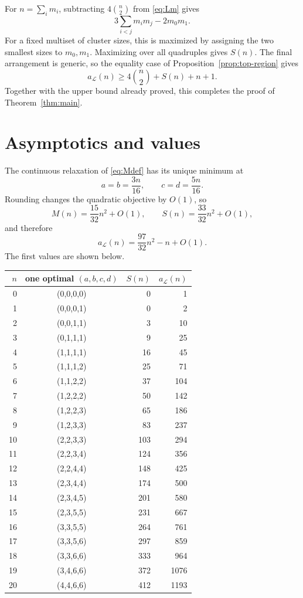 \documentclass[11pt]{article}
\theoremstyle{plain}
\theoremstyle{definition}
\theoremstyle{remark}
\newcommand{\Lop}{\mathcal L}
\newcommand{\1}{\mathbf 1}
\begin{document}
For $n=\sum_i m_i$, subtracting $4\binom n2$ from \eqref{eq:Lm} gives
\[
 3\sum_{i<j}m_i m_j-2m_0m_1.
\]
For a fixed multiset of cluster sizes, this is maximized by assigning the two
smallest sizes to $m_0,m_1$.  Maximizing over all quadruples gives $S(n)$.
The final arrangement is generic, so the equality case of
Proposition~\ref{prop:top-region} gives
\[
 a_{\Lop}(n)\geq4\binom n2+S(n)+n+1.
\]
Together with the upper bound already proved, this completes the proof of
Theorem~\ref{thm:main}.

\section{Asymptotics and values}\label{sec:values}

The continuous relaxation of \eqref{eq:Mdef} has its unique minimum at
\[
 a=b=\frac{3n}{16},\qquad c=d=\frac{5n}{16}.
\]
Rounding changes the quadratic objective by $O(1)$, so
\[
 M(n)=\frac{15}{32}n^2+O(1),
 \qquad S(n)=\frac{33}{32}n^2+O(1),
\]
and therefore
\[
 a_{\Lop}(n)=\frac{97}{32}n^2-n+O(1).
\]
The first values are shown below.

\begin{center}
\begin{tabular}{@{}rcrr@{}}
\toprule
$n$&one optimal $(a,b,c,d)$&$S(n)$&$a_{\Lop}(n)$\\
\midrule
0&(0,0,0,0)&0&1\\
1&(0,0,0,1)&0&2\\
2&(0,0,1,1)&3&10\\
3&(0,1,1,1)&9&25\\
4&(1,1,1,1)&16&45\\
5&(1,1,1,2)&25&71\\
6&(1,1,2,2)&37&104\\
7&(1,2,2,2)&50&142\\
8&(1,2,2,3)&65&186\\
9&(1,2,3,3)&83&237\\
10&(2,2,3,3)&103&294\\
11&(2,2,3,4)&124&356\\
12&(2,2,4,4)&148&425\\
13&(2,3,4,4)&174&500\\
14&(2,3,4,5)&201&580\\
15&(2,3,5,5)&231&667\\
16&(3,3,5,5)&264&761\\
17&(3,3,5,6)&297&859\\
18&(3,3,6,6)&333&964\\
19&(3,4,6,6)&372&1076\\
20&(4,4,6,6)&412&1193\\
\bottomrule
\end{tabular}
\end{center}
\end{document}

